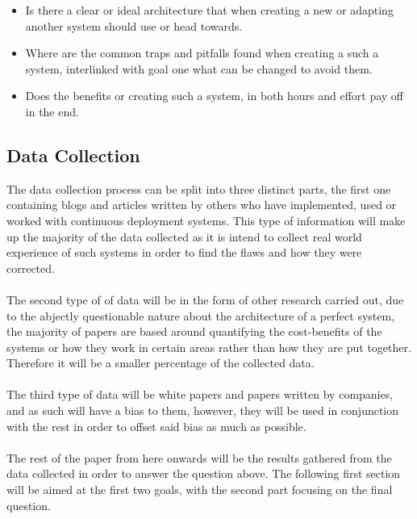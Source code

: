 \begin{itemize}
  \item Is there a clear or ideal architecture that when creating a new or adapting another system should use or head towards.\\
    \item Where are the common traps and pitfalls found when creating a such a system, interlinked  with goal one what can be changed to avoid them.\\
  \item Does the benefits or creating such a system, in both hours and effort pay off in the end. \\
\end{itemize}

\subsection{Data Collection}

The data collection process can be split into three distinct parts, the first one containing blogs and articles written by others who have implemented, used or worked with continuous deployment systems. This type of information will make up the majority of the data collected as it is intend to collect real world experience of such systems in order to find the flaws and how they were corrected.
\\\\
The second type of of data will be in the form of other research carried out, due to the abjectly questionable nature about the architecture of a perfect system, the majority of papers are based around quantifying the cost-benefits of the systems or how they work in certain areas rather than how they are put together. Therefore it will be a smaller percentage of the collected data.
\\\\
The third type of data will be white papers and papers written by companies, and as such will have a bias to them, however, they will be used in conjunction with the rest in order to offset said bias as much as possible.
\\\\
The rest of the paper from here onwards will be the results gathered from the data collected in order to answer the question above. The following first section will be aimed at the first two goals, with the second part focusing on the final question.